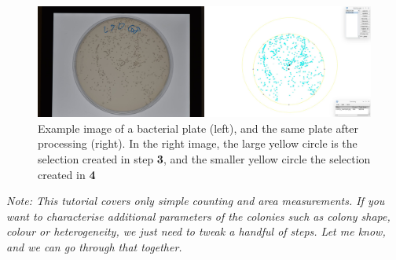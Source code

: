 \documentclass[11pt]{article}
\begin{document}
 \begin{figure}
 	\centering
 	\includegraphics[width=0.95\linewidth]{colony_montage}
 	\caption[Example output.]{Example image of a bacterial plate (left), and the same plate after processing (right). In the right image, the large yellow circle is the selection created in step \textbf{3}, and the smaller yellow circle the selection created in \textbf{4}}
 	\label{fig:colonymontage}
 \end{figure}

\noindent\textit{Note: This tutorial covers only simple counting and area measurements. If you want to characterise additional parameters of the colonies such as colony shape, colour or heterogeneity, we just need to tweak a handful of steps. Let me know, and we can go through that together.}
 
 		
\end{document}
